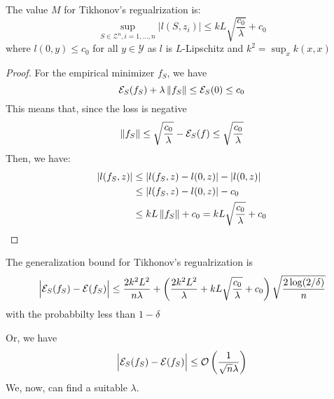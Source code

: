 \begin{proposition}
    The value $M$ for Tikhonov's regualrization is:
    \begin{equation*}
        \sup_{S\in\mathcal{Z}^n, i=1,\dots,n}|l(S, z_i)| \le kL\sqrt{\frac{c_0}{\lambda}} + c_0
    \end{equation*}
    where $l(0, y)\le c_0$ for all $y\in\mathcal{Y}$ as $l$ is $L$-Lipschitz and $k^2 = \sup_x k(x, x)$
\end{proposition}
\begin{proof}
    For the empirical minimizer $f_S$, we have 
    \begin{equation*}
        \mathcal{E}_S(f_S) + \lambda\left\lVert f_S\right\rVert \le \mathcal{E}_S(0) \le c_0
    \end{equation*}
    This means that, since the loss is negative
    \begin{equation*}
        \left\lVert f_S\right\rVert \le \sqrt{\frac{c_0}{\lambda}} -\mathcal{E}_S(f) \le  \sqrt{\frac{c_0}{\lambda}}
    \end{equation*}
    Then, we have:
    \begin{equation*}
    \begin{aligned}
        \left| l(f_S, z) \right| &\le \left| l(f_S, z) - l(0, z) \right| - \left| l(0, z) \right| \\
        &\le \left| l(f_S, z) - l(0, z) \right| - c_0 \\
        &\le kL\left\lVert f_S\right\rVert + c_0 = kL\sqrt{\frac{c_0}{\lambda}} + c_0
    \end{aligned}
    \end{equation*}
\end{proof}

\begin{corollary}
    The generalization bound for Tikhonov's regualrization is 
    \begin{equation*}
        \Big| \mathcal{E}_S(f_S) - \mathcal{E}(f_S) \Big| \le \frac{2k^2L^2}{n\lambda} + \left(  \frac{2k^2L^2}{\lambda} + kL\sqrt{\frac{c_0}{\lambda}} + c_0  \right)\sqrt{\frac{2\log(2/\delta)}{n}}
    \end{equation*}
    with the probabbilty less than $1-\delta$
\end{corollary}

\begin{remark}
    Or, we have
    \begin{equation*}
        \Big| \mathcal{E}_S(f_S) - \mathcal{E}(f_S) \Big| \le \mathcal{O}\left( \frac{1}{\sqrt{n}\lambda} \right)
    \end{equation*}
    We, now, can find a suitable $\lambda$.
\end{remark}

